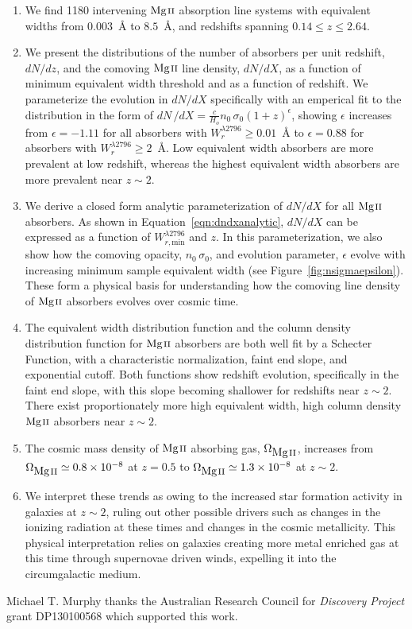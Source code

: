 \documentclass[iop,apj,numberedappendix,appendixfloats,twocolappendix]{emulateapj}
\begin{document}
\begin{enumerate}
\item We find 1180 intervening ${\hbox{{\rm Mg}\kern 0.1em{\sc ii}}}$ absorption line systems with equivalent widths from $0.003$~{\AA} to $8.5$~{\AA}, and redshifts spanning $0.14 \le z \le 2.64$. 
\item We present the distributions of the number of absorbers per unit redshift, $dN\!/dz$, and the comoving ${\hbox{{\rm Mg}\kern 0.1em{\sc ii}}}$ line density, $dN\!/dX$, as a function of minimum equivalent width threshold and as a function of redshift. We parameterize the evolution in $dN\!/dX$ specifically with an emperical fit to the distribution in the form of $dN\,/dX = \frac{c}{H_o}n_0\,\sigma_0(1 + z)^{\epsilon}$, showing $\epsilon$ increases from $\epsilon=-1.11$ for all absorbers with $W_r^{\lambda2796} \ge 0.01$~{\AA} to $\epsilon=0.88$ for absorbers with $W_r^{\lambda2796} \ge 2$~{\AA}. Low equivalent width absorbers are more prevalent at low redshift, whereas the highest equivalent width absorbers are more prevalent near $z \sim 2$.
\item We derive a closed form analytic parameterization of $dN\!/dX$ for all ${\hbox{{\rm Mg}\kern 0.1em{\sc ii}}}$ absorbers. As shown in Equation~\ref{eqn:dndxanalytic}, $dN\!/dX$ can be expressed as a function of $W_{r,\mathrm{min}}^{\lambda2796}$ and $z$. In this parameterization, we also show how the comoving opacity, $n_0\,\sigma_0$, and evolution parameter, $\epsilon$ evolve with increasing minimum sample equivalent width (see Figure~\ref{fig:nsigmaepsilon}). These form a physical basis for understanding how the comoving line density of ${\hbox{{\rm Mg}\kern 0.1em{\sc ii}}}$ absorbers evolves over cosmic time. 
\item The equivalent width distribution function and the column density distribution function for ${\hbox{{\rm Mg}\kern 0.1em{\sc ii}}}$ absorbers are both well fit by a Schecter Function, with a characteristic normalization, faint end slope, and exponential cutoff. Both functions show redshift evolution, specifically in the faint end slope, with this slope becoming shallower for redshifts near $z \sim 2$. There exist proportionately more high equivalent width, high column density ${\hbox{{\rm Mg}\kern 0.1em{\sc ii}}}$ absorbers near $z \sim 2$.
\item The cosmic mass density of ${\hbox{{\rm Mg}\kern 0.1em{\sc ii}}}$ absorbing gas, $\Omega_{\hbox{{\rm Mg}\kern 0.1em{\sc ii}}}$, increases from $\Omega_{\hbox{{\rm Mg}\kern 0.1em{\sc ii}}} \simeq 0.8\times10^{-8}$ at $z = 0.5$ to $\Omega_{\hbox{{\rm Mg}\kern 0.1em{\sc ii}}} \simeq 1.3\times10^{-8}$ at $z \sim 2$.
\item We interpret these trends as owing to the increased star formation activity in galaxies at $z \sim 2$, ruling out other possible drivers such as changes in the ionizing radiation at these times and changes in the cosmic metallicity. This physical interpretation relies on galaxies creating more metal enriched gas at this time through supernovae driven winds, expelling it into the circumgalactic medium. 
\end{enumerate}

Michael T. Murphy thanks the Australian Research Council for \textsl{Discovery Project} grant DP130100568 which supported this work.



\end{document}
